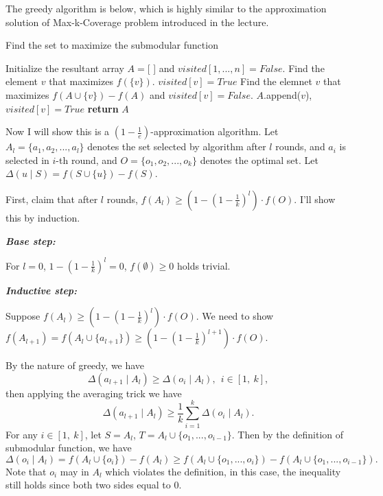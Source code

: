 \documentclass{oxmathproblems}
\begin{document}
\begin{questions}
\begin{Solution}

The greedy algorithm is below, which is highly similar to the approximation solution of Max-k-Coverage problem introduced in the lecture.

\begin{algorithm}[H]
    \caption{Find the set to maximize the submodular function}
    \label{}
    \begin{algorithmic}[1]
        \State Initialize the resultant array $A=$[ ] and $visited[1,...,n]=False$.
        \State Find the element $v$ that maximizes $f(\{v\})$.
        \State $visited[v]=True$
            \State Find the elemnet $v$ that maximizes $f(A\cup\{v\})-f(A)$ and $visited[v]=False$.
            \State $A$.append($v$), $visited[v]=True$
        \EndFor
        \State \textbf{return} $A$
    \end{algorithmic}
\end{algorithm}

Now I will show this is a $(1-\frac{1}{e})$-approximation algorithm. Let $A_l=\{a_1, a_2, ..., a_l\}$ denotes the set selected by algorithm after $l$ rounds, and $a_i$ is selected in $i$-th round, and $O=\{o_1, o_2, ..., o_k\}$ denotes the optimal set. Let $\Delta (u\mid S)=f(S\cup \{u\})-f(S)$. 

First, claim that after $l$ rounds, $f(A_l)\geq (1-(1-\frac{1}{k})^l)\cdot f(O)$. I'll show this by induction.

\textbf{\textit{Base step:}}

For $l=0$, $1-(1-\frac{1}{k})^l=0$, $f(\emptyset)\ge 0$ holds trivial.

\textbf{\textit{Inductive step:}}

Suppose $f(A_l)\geq (1-(1-\frac{1}{k})^l)\cdot f(O)$. We need to show $f(A_{l+1})=f(A_l\cup \{a_{l+1}\})\geq (1-(1-\frac{1}{k})^{l+1})\cdot f(O)$.

By the nature of greedy, we have $$\Delta (a_{l+1}\mid A_l)\geq \Delta (o_i\mid A_l),\ \ i\in[1,\ k],$$ then applying the averaging trick we have $$\Delta (a_{l+1}\mid A_l)\geq \frac{1}{k}\sum_{i=1}^k\Delta (o_i\mid A_l).$$ For any $i\in [1,\ k]$, let $S=A_l$, $T=A_l\cup\{o_1,...,o_{i-1}\}$. Then by the definition of submodular function, we have $$\Delta (o_i\mid A_l)=f(A_l\cup\{o_i\})-f(A_l)\ge f(A_l\cup \{o_1, ..., o_i\})-f(A_l\cup \{o_1, ..., o_{i-1}\}).$$ Note that $o_i$ may in $A_l$ which violates the definition, in this case, the inequality still holds since both two sides equal to $0$. 


\end{Solution}
\end{questions}
\end{document}
